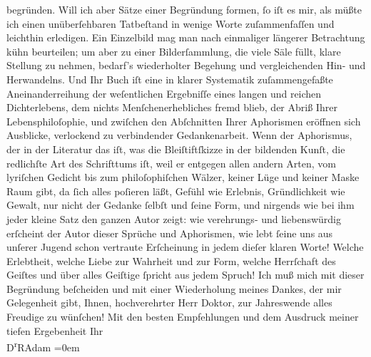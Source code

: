 \begin{ledgroupsized}[t]{13cm}
               begründen. Will ich aber Sätze einer Begründung formen, ſo iſt es mir, als müßte ich
               einen unüberſehbaren Tatbeſtand in wenige Worte zuſammenfaſſen und leichthin
               erledigen. Ein Einzelbild mag man nach einmaliger längerer Betrachtung {\pb}kühn beurteilen; um aber zu einer
               Bilderſammlung, die viele Säle füllt, klare Stellung zu nehmen, bedarf’s wiederholter
               Begehung und vergleichenden Hin- und Herwandelns. Und Ihr Buch iſt eine in klarer
               Systematik zuſammengefaßte Aneinanderreihung der weſentlichen Ergebniſſe eines langen
               und reichen Dichterlebens, dem nichts Menſchenerhebliches fremd blieb, der Abriß
               Ihrer Lebensphiloſophie, und zwiſchen den Abſchnitten Ihrer Aphorismen eröffnen sich
               Ausblicke, verlockend zu verbindender Gedankenarbeit. Wenn der Aphorismus, der in der
               Literatur das iſt, was die Bleiſtiftſkizze in der bildenden Kunſt, die redlichſte Art
               des Schrifttums iſt, weil er entgegen allen andern Arten, vom lyriſchen Gedicht bis
               zum philoſophiſchen Wälzer, keiner Lüge und keiner Maske Raum  gibt, {\pb}da ſich alles poſieren läßt, Gefühl wie Erlebnis, Gründlichkeit wie Gewalt, nur
               nicht der Gedanke ſelbſt und ſeine Form, und nirgends wie bei ihm jeder kleine Satz
               den ganzen Autor zeigt: wie verehrungs- und liebenswürdig erſcheint der Autor dieser
               Sprüche und Aphorismen, wie lebt ſeine uns aus unſerer Jugend schon vertraute
               Erſcheinung in jedem dieſer klaren Worte! Welche Erlebtheit, welche Liebe zur
               Wahrheit und zur Form, welche Herrſchaft des Geiſtes und über alles Geiſtige ſpricht
               aus jedem Spruch!\pend
           \pstart
           Ich muß mich mit dieser Begründung beſcheiden und mit einer Wiederholung meines
               Dankes, der mir Gelegenheit gibt, Ihnen, hochverehrter Herr Doktor, zur Jahreswende
               alles Freudige zu wünſchen!\pend
           \pstart
           Mit den besten Empfehlungen und {\pb}dem
               Ausdruck meiner tiefen Ergebenheit\pend
           \pstart
           Ihr{\\[\baselineskip]}\spacefill\mbox{D\textsuperscript{r}RAdam}\pend
           \leftskip=0em{}
         
         \endnumbering{}\end{ledgroupsized}  \newcommand{\dateiname}{L02497}\newcommand{\titel}{Robert Adam an Arthur Schnitzler, 30. 12. 1927}\newcommand{\editorInnen}{Martin Anton Müller und Gerd-Hermann Susen}
      